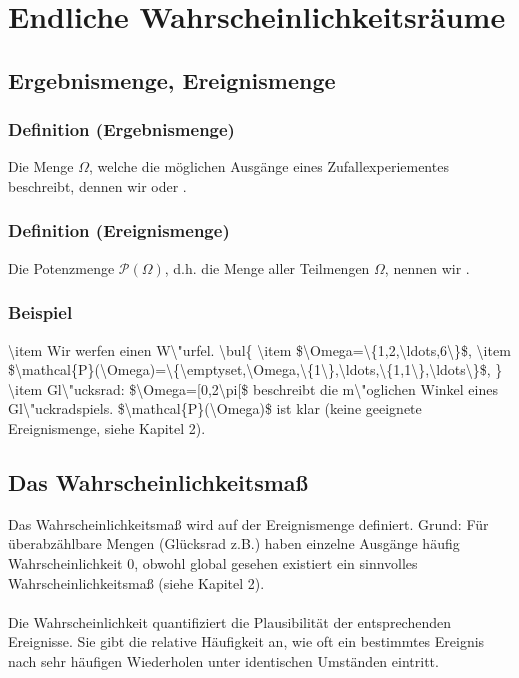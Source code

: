 \section{Endliche Wahrscheinlichkeitsr\"aume}
\subsection{Ergebnismenge, Ereignismenge}
\subsubsection{Definition (Ergebnismenge)}
Die Menge $\Omega$, welche die m\"oglichen Ausg\"ange eines Zufallexperiementes beschreibt, dennen wir  oder .
\subsubsection{Definition (Ereignismenge)}
Die Potenzmenge $\mathcal{P}(\Omega)$, d.h. die Menge aller Teilmengen $\Omega$, nennen wir .
\subsubsection{Beispiel}
\num{
\item Wir werfen einen W\"urfel.
\bul{
\item $\Omega=\{1,2,\ldots,6\}$,
\item $\mathcal{P}(\Omega)=\{\emptyset,\Omega,\{1\},\ldots,\{1,1\},\ldots\}$,
}
\item Gl\"ucksrad: $\Omega=[0,2\pi[$ beschreibt die m\"oglichen Winkel eines Gl\"uckradspiels. $\mathcal{P}(\Omega)$ ist klar (keine geeignete Ereignismenge, siehe Kapitel 2).
}
\subsection{Das Wahrscheinlichkeitsma\ss{}}
Das Wahrscheinlichkeitsma\ss{} wird auf der Ereignismenge definiert. Grund: F\"ur \"uberabz\"ahlbare Mengen (Gl\"ucksrad z.B.) haben einzelne Ausg\"ange h\"aufig Wahrscheinlichkeit $0$, obwohl global gesehen existiert ein sinnvolles Wahrscheinlichkeitsma\ss{} (siehe Kapitel 2).
\\~\\
Die Wahrscheinlichkeit quantifiziert die Plausibilit\"at der entsprechenden Ereignisse. Sie gibt die relative H\"aufigkeit an, wie oft ein bestimmtes Ereignis nach sehr h\"aufigen Wiederholen unter identischen Umst\"anden eintritt.
